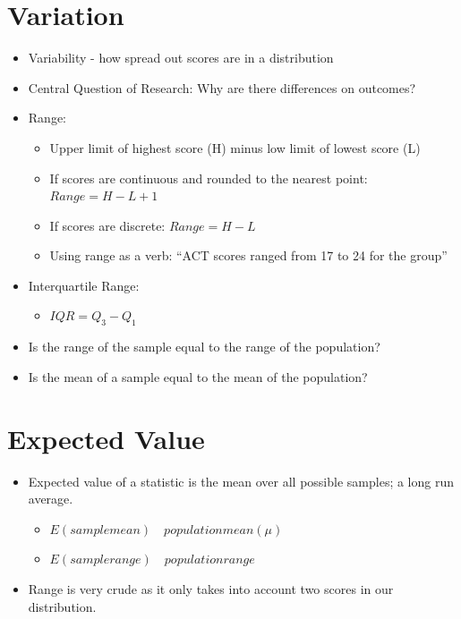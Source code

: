 \documentclass[12pt]{article}
\begin{document}
\section{Variation}\label{variation}

\begin{itemize}
\item
  Variability - how spread out scores are in a distribution
\item
  Central Question of Research: Why are there differences on outcomes?
\item
  Range:

  \begin{itemize}
  \itemsep1pt\parskip0pt
  \item
    Upper limit of highest score (H) minus low limit of lowest score (L)
  \item
    If scores are continuous and rounded to the nearest point:
    \(Range = H - L + 1\)
  \item
    If scores are discrete: \(Range = H - L\)
  \item
    Using range as a verb: ``ACT scores ranged from 17 to 24 for the
    group''
  \end{itemize}
\item
  Interquartile Range:

  \begin{itemize}
  \itemsep1pt\parskip0pt
  \item
    \(IQR = Q_{3} - Q_{1}\)
  \end{itemize}
\item
  Is the range of the sample equal to the range of the population?
\item
  Is the mean of a sample equal to the mean of the population?
\end{itemize}

\section{Expected Value}\label{expected-value}

\begin{itemize}
\itemsep1pt\parskip0pt
\item
  Expected value of a statistic is the mean over all possible samples; a
  long run average.

  \begin{itemize}
  \itemsep1pt\parskip0pt
  \item
    \(E(sample mean) \quad  population mean (\mu)\)
  \item
    \(E(sample range) \quad population range\)
  \end{itemize}
\item
  Range is very crude as it only takes into account two scores in our
  distribution.
\end{itemize}
\end{document}
